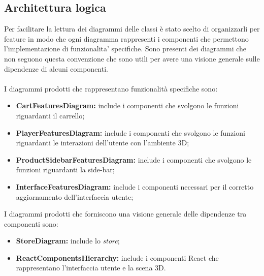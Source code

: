 \subsection{Architettura logica}
Per facilitare la lettura dei diagrammi delle classi è stato scelto di organizzarli per feature in modo che ogni diagramma 
rappresenti i componenti che permettono l'implementazione di funzionalita' specifiche.
Sono presenti dei diagrammi che non seguono questa convenzione che sono utili per avere una visione generale sulle dipendenze
di alcuni componenti.
\\\\
I diagrammi prodotti che rappresentano funzionalità specifiche sono:
\begin{itemize}
	\item \textbf{CartFeaturesDiagram:} include i componenti che svolgono le funzioni riguardanti il carrello;
	\item \textbf{PlayerFeaturesDiagram:} include i componenti che svolgono le funzioni riguardanti le interazioni dell'utente con 
	l'ambiente 3D;
	\item \textbf{ProductSidebarFeaturesDiagram:} include i componenti che svolgono le funzioni riguardanti la side-bar;
	\item \textbf{InterfaceFeaturesDiagram:} include i componenti necessari per il corretto aggiornamento dell'interfaccia utente;
\end{itemize}
I diagrammi prodotti che forniscono una visione generale delle dipendenze tra componenti sono:
\begin{itemize}
	\item \textbf{StoreDiagram:} include lo \textit{store};
	\item \textbf{ReactComponentsHierarchy:} include i componenti React che rappresentano l'interfaccia utente e la scena 3D.
\end{itemize}

